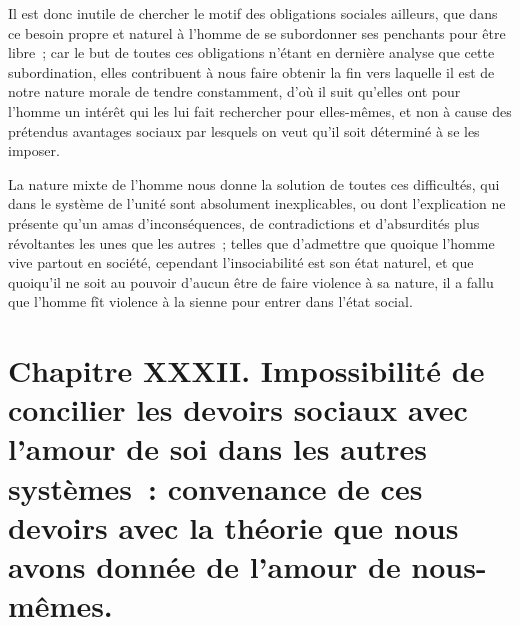 \documentclass[french,twoside]{book} %
\newcommand\chapteropen{} %
\newcommand\chapterclose{} %
\begin{document}
Il est donc inutile de chercher le motif des obligations sociales ailleurs, que dans ce besoin propre et naturel à l’homme de se subordonner ses penchants pour être libre ; car le but de toutes ces obligations n’étant en dernière analyse que cette subordination, elles contribuent à nous faire obtenir la fin vers laquelle il est de notre nature morale de tendre constamment, d’où il suit qu’elles ont pour l’homme un intérêt qui les lui fait rechercher pour elles-mêmes, et non à cause des prétendus avantages sociaux par lesquels on veut qu’il soit déterminé à se les imposer.\par
La nature mixte de l’homme nous donne la solution de toutes ces difficultés, qui dans le système de l’unité sont absolument inexplicables, ou dont l’explication ne présente qu’un amas d’inconséquences, de contradictions et d’absurdités plus révoltantes les unes que les autres ; telles que d’admettre que quoique l’homme vive partout en société, cependant l’insociabilité est son état naturel, et que quoiqu’il ne soit au pouvoir d’aucun être de faire violence à sa nature, il a fallu que l’homme fît violence à la sienne pour entrer dans l’état social.
\chapterclose


\chapteropen
\chapter[{Chapitre XXXII. Impossibilité de concilier les devoirs sociaux avec l’amour de soi dans les autres systèmes : convenance de ces devoirs avec la théorie que nous avons donnée de l’amour de nous-mêmes.}]{Chapitre XXXII. Impossibilité de concilier les devoirs sociaux avec l’amour de soi dans les autres systèmes : convenance de ces devoirs avec la théorie que nous avons donnée de l’amour de nous-mêmes.}\renewcommand{\leftmark}{Chapitre XXXII. Impossibilité de concilier les devoirs sociaux avec l’amour de soi dans les autres systèmes : convenance de ces devoirs avec la théorie que nous avons donnée de l’amour de nous-mêmes.}
\end{document}
